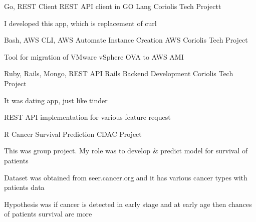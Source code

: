 \begin{cventries}
    \cventry
    {Go, REST Client} %
    {REST API client in GO Lang} %
    {Coriolis Tech Projectt} %
    {} %
    {
      \begin{cvitems} %
        \item {I developed this app, which is replacement of curl}
      \end{cvitems}
    }
   
    \cventry
    {Bash, AWS CLI, AWS} %
    {Automate Instance Creation AWS} %
    {Coriolis Tech Project} %
    {} %
    {
      \begin{cvitems} %
        \item {Tool for migration of VMware vSphere OVA to AWS AMI}
      \end{cvitems}
    }
   
    \cventry
    {Ruby, Rails, Mongo, REST API} %
    {Rails Backend Development} %
    {Coriolis Tech Project} %
    {} %
    {
      \begin{cvitems} %
        \item {It was dating app, just like tinder}
        \item {REST API implementation for various feature request}
      \end{cvitems}
    }
  
   \cventry
    {R} %
    {Cancer Survival Prediction} %
    {CDAC Project} %
    {} %
    {
      \begin{cvitems} %
        \item {This was group project. My role was  to develop \& predict model for survival of patients}
        \item {Dataset was obtained from seer.cancer.org and it has various cancer types with patients data}
        \item {Hypothesis was if cancer is detected in early stage and at early age 
               then chances of patients survival are more}
      \end{cvitems}
    }


\end{cventries}
